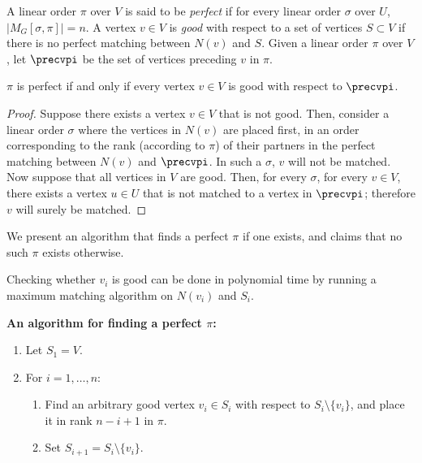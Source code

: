 %

A linear order $\pi$ over $V$ is said to be \emph{perfect} if for every linear order $\sigma$ over $U$, $|M_G[\sigma,\pi]| = n$.
A vertex $v \in V$ is \emph{good} with respect to a set of vertices $S \subset V$ if there is no perfect matching between $N(v)$ and $S$.
Given a linear order $\pi$ over $V$, let $\precvpi$ be the set of vertices preceding $v$ in $\pi$.

\begin{observation}
	\label{obs:perfect-pi}
	$\pi$ is perfect if and only if every vertex $v \in V$ is good with respect to $\precvpi$.
\end{observation}
\begin{proof}
	Suppose there exists a vertex $v \in V$ that is not good. Then, consider a linear order $\sigma$ where the vertices in $N(v)$ are placed first, in an order corresponding to the rank (according to $\pi$) of their partners in the perfect matching between $N(v)$ and $\precvpi$. In such a $\sigma$, $v$ will not be matched.
	Now suppose that all vertices in $V$ are good.
	Then, for every $\sigma$, for every $v \in V$, there exists a vertex $u \in U$ that is not matched to a vertex in $\precvpi$; therefore $v$ will surely be matched.	
\end{proof}


We present an algorithm that finds a perfect $\pi$ if one exists, and claims that no such $\pi$ exists otherwise.

Checking whether $v_i$ is good can be done in polynomial time by running a maximum matching algorithm on $N(v_i)$ and $S_i$.

\medskip
\noindent\textbf{An algorithm for finding a perfect $\pi$:}
\begin{enumerate}
	\item Let $S_1=V$.
%
%
\item For $i=1,\ldots,n$:    %
	\begin{enumerate}
		\item Find an arbitrary good vertex $v_i \in S_i$ with respect to $S_i \setminus \{v_i\}$, and place it in rank $n-i+1$ in $\pi$.
		\item Set $S_{i+1}=S_i \setminus \{v_i\}$.
	\end{enumerate}
\end{enumerate}

